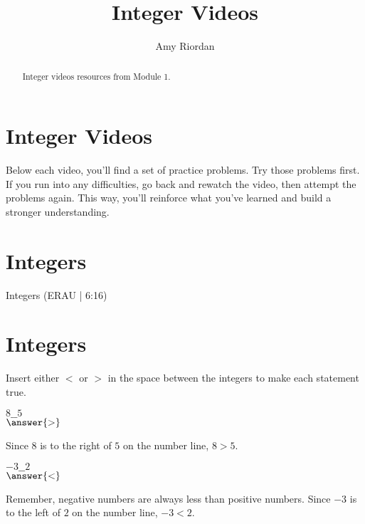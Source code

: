 \documentclass{ximera}
\title{Integer Videos}
\author{Amy Riordan}
\begin{document}
\begin{abstract}
Integer videos resources from Module 1.
\end{abstract}
\maketitle

\section*{Integer Videos}

Below each video, you'll find a set of practice problems. Try those problems first. If you run into any difficulties, go back and rewatch the video, then attempt the problems again. This way, you'll reinforce what you’ve learned and build a stronger understanding.

\section*{Integers}

Integers (ERAU | 6:16)


\section*{Integers}


Insert either $<$ or $>$ in the space between the integers to make each statement true.

\begin{problem}
$8\_\_5$\\
$\answer{>}$

\begin{feedback}
Since $8$ is to the right of $5$ on the number line, $8 > 5$.
\end{feedback}
\end{problem}

\begin{problem}
$-3\_\_2$\\
$\answer{<}$

\begin{feedback}
Remember, negative numbers are always less than positive numbers. Since $-3$ is to the left of $2$ on the number line, $-3 < 2$.
\end{feedback}

\end{problem}
\end{document}
